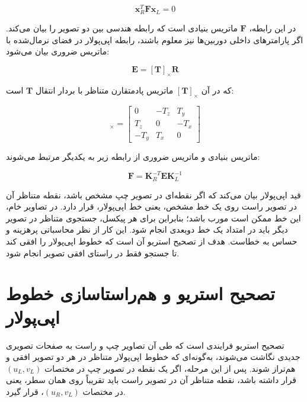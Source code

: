 \begin{equation}
	\mathbf{x}_R^T \mathbf{F} \mathbf{x}_L = 0
	\label{eq:epipolar_constraint}
\end{equation}

در این رابطه، \(\mathbf{F}\) ماتریس بنیادی%
است که رابطه هندسی بین دو تصویر را بیان می‌کند. اگر پارامترهای داخلی دوربین‌ها نیز معلوم باشند، رابطه اپی‌پولار در فضای نرمال‌شده با ماتریس ضروری%
بیان می‌شود:

\begin{equation}
	\mathbf{E} = [\mathbf{T}]_{\times}\mathbf{R}
	\label{eq:essential_matrix}
\end{equation}

که در آن \([\mathbf{T}]_{\times}\) ماتریس پادمتقارن متناظر با بردار انتقال \(\mathbf{T}\) است:

\begin{equation}
	[\mathbf{T}]_{\times} =
	\begin{bmatrix}
		0 & -T_z & T_y \\
		T_z & 0 & -T_x \\
		-T_y & T_x & 0
	\end{bmatrix}
\end{equation}

ماتریس بنیادی و ماتریس ضروری از رابطه زیر به یکدیگر مرتبط می‌شوند:

\begin{equation}
	\mathbf{F}
	=
	\mathbf{K}_R^{-T}
	\mathbf{E}
	\mathbf{K}_L^{-1}
	\label{eq:F_from_E}
\end{equation}

قید اپی‌پولار بیان می‌کند که اگر نقطه‌ای در تصویر چپ مشخص باشد، نقطه متناظر آن در تصویر راست روی یک خط مشخص، یعنی خط اپی‌پولار، قرار دارد. در تصاویر خام، این خط ممکن است مورب باشد؛ بنابراین برای هر پیکسل، جستجوی متناظر در تصویر دیگر باید در امتداد یک خط دوبعدی انجام شود. این کار از نظر محاسباتی پرهزینه و حساس به خطاست. هدف از تصحیح استریو آن است که خطوط اپی‌پولار را افقی کند تا جستجو فقط در راستای افقی تصویر انجام شود.

\section{تصحیح استریو و هم‌راستاسازی خطوط اپی‌پولار}

تصحیح استریو%
فرایندی است که طی آن تصاویر چپ و راست به صفحات تصویری جدیدی نگاشت می‌شوند، به‌گونه‌ای که خطوط اپی‌پولار متناظر در هر دو تصویر افقی و هم‌تراز شوند. پس از این مرحله، اگر یک نقطه در تصویر چپ در مختصات \((u_L,v_L)\) قرار داشته باشد، نقطه متناظر آن در تصویر راست باید تقریباً روی همان سطر، یعنی در مختصات \((u_R,v_L)\)، قرار گیرد.

